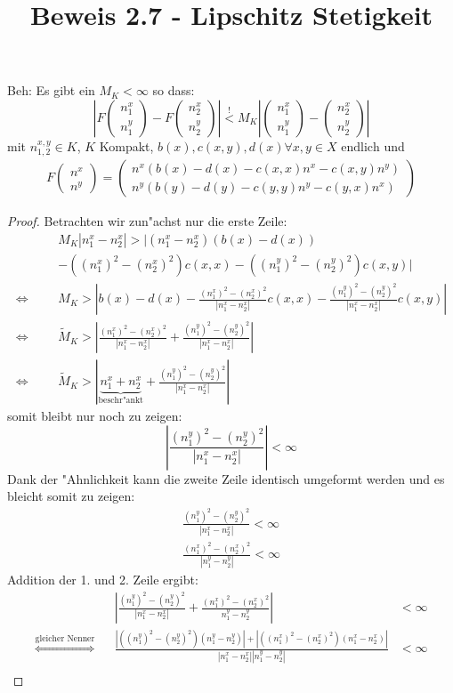 \documentclass[11pt,a4paper,notitlepage]{article}
\title{Beweis 2.7 - Lipschitz Stetigkeit}
\newcommand{\tvec}[2]{\begin{pmatrix}#1\\#2\end{pmatrix}}
\begin{document}
\maketitle
Beh: Es gibt ein $ M_K < \infty $ so dass:
\[ \left| F\tvec{n_1^x}{n_1^y} - F\tvec{n_2^x}{n_2^y} \right| \overset{!}{<} M_K \left| \tvec{n_1^x}{n_1^y} - \tvec{n_2^x}{n_2^y} \right|\] 
mit $ n_{1,2}^{x,y} \in K $, $ K $ Kompakt, $ b(x), c(x,y), d(x) \forall x,y \in X \text{ endlich}$ und 
\begin{align}
	F\tvec{n^x}{n^y} = \tvec{n^x(b(x)-d(x)-c(x,x)n^x-c(x,y)n^y)}{n^y(b(y)-d(y)-c(y,y)n^y-c(y,x)n^x)}
	\label{nDGL}
\end{align}

\begin{proof}
	Betrachten wir zun"achst nur die erste Zeile:
	\begin{align*}
		 &&& M_K |n_1^x - n_2^x| >  |
		 (n_1^x - n_2^x)(b(x)-d(x))\\
		 &&&  - ((n_1^x)^2 - (n_2^x)^2)c(x,x) - ((n_1^y)^2 - (n_2^y)^2)c(x,y)|\\
		 \Leftrightarrow&&& M_K >  \left| b(x) - d(x)
		 - \frac{(n_1^x)^2 - (n_2^x)^2}{|n_1^x - n_2^x|}c(x,x) - \frac{(n_1^y)^2 - (n_2^y)^2}{|n_1^x - n_2^x|}c(x,y) \right|\\
		 \Leftrightarrow&&& \tilde{M}_K > \left| \frac{(n_1^x)^2 - (n_2^x)^2}{|n_1^x - n_2^x|} + \frac{(n_1^y)^2 - (n_2^y)^2}{|n_1^x - n_2^x|} \right|\\
		 \Leftrightarrow&&& \tilde{M}_K > \left| \underbrace{n_1^x + n_2^x}_{\text{beschr"ankt}} + \frac{(n_1^y)^2 - (n_2^y)^2}{|n_1^x - n_2^x|} \right|
	\end{align*}
	somit bleibt nur noch zu zeigen:
	\[ \left| \frac{(n_1^y)^2 - (n_2^y)^2}{|n_1^x - n_2^x|} \right| < \infty \]
	Dank der "Ahnlichkeit kann die zweite Zeile identisch umgeformt werden und es bleicht somit zu zeigen:
	\begin{align}
		\frac{(n_1^y)^2 - (n_2^y)^2}{|n_1^x - n_2^x|} < \infty\\
		\frac{(n_1^x)^2 - (n_2^x)^2}{|n_1^y - n_2^y|} < \infty
	\end{align}
	Addition der 1. und 2. Zeile ergibt:
	\begin{align*}
		&& \left| \frac{(n_1^y)^2 - (n_2^y)^2}{|n_1^x - n_2^x|} + 
		\frac{(n_1^x)^2 - (n_2^x)^2}{n_1^y - n_2^y} \right| &< \infty\\
		\overset{\text{gleicher Nenner}}{\Leftrightarrow} && \frac{|((n_1^y)^2 - (n_2^y)^2)(n_1^y - n_2^y)| + |((n_1^x)^2 - (n_2^x)^2)(n_1^x - n_2^x)|}{|n_1^x - n_2^x||n_1^y - n_2^y|} &< \infty\\

\end{align*}
\end{proof}
\end{document}
